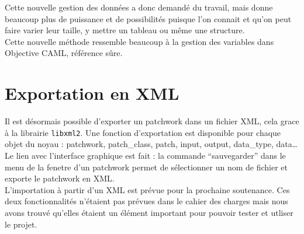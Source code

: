 \newpage

Cette nouvelle gestion des donn\'ees a donc demand\'e du travail,
mais donne beaucoup plus de puissance et de possibilit\'es puisque
l'on connait et qu'on peut faire varier leur taille, y mettre un tableau
ou m\^eme une structure. \\
Cette nouvelle m\'ethode ressemble beaucoup \`a la gestion
des variables dans Objective CAML, r\'ef\'erence s\^ure.\\


\section{Exportation en XML}

Il est d\'esormais possible d'exporter un patchwork dans un fichier XML,
cela grace \`a la librairie {\tt libxml2}.
Une fonction d'exportation est disponible pour chaque objet du noyau :
patchwork, patch\_class, patch, input, output, data\_type, data\ldots\\

Le lien avec l'interface graphique est fait : la commande ``sauvegarder''
dans le menu de la fenetre d'un patchwork permet de s\'electionner
un nom de fichier et exporte le patchwork en XML.\\

L'importation \`a partir d'un XML est pr\'evue pour la prochaine soutenance.
Ces deux fonctionnalit\'es n'\'etaient pas pr\'evues dans le cahier
des charges mais nous avons trouv\'e qu'elles \'etaient un \'el\'ement
important pour pouvoir tester et utliser le projet.\\

